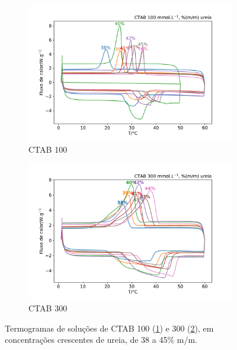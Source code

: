 	\begin{figure}[H]
		\begin{subfigure}[t]{0.45\textwidth}
			\centering
			\includegraphics[width=\textwidth]{./imagens/dsc/CTAB_porc_ur}
			\caption{CTAB 100 \mM{}}
			\label{fig:DSC_CTAB100_UR38-45}	
		\end{subfigure}\qquad%
		\begin{subfigure}[t]{0.45\textwidth}
			\centering
			\includegraphics[width=\textwidth]{./imagens/dsc/CTAB_300_porc_ur}
			\caption{CTAB 300 \mM}
			\label{fig:DSC_CTAB300_UR38-45}
		\end{subfigure}
		\caption{Termogramas de soluções de CTAB 100 \mM{} (\ref{fig:DSC_CTAB100_UR38-45}) e 300 \mM{} (\ref{fig:DSC_CTAB300_UR38-45}), em concentrações crescentes de ureia, de 38 a 45\% m/m.}
		\label{fig:DSC_CTAB_100_300_Ur38-45}
	\end{figure}
	
